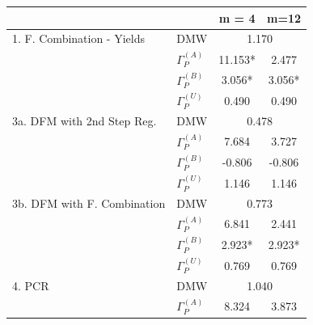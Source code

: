 \documentclass[11pt]{article}
\begin{document}
\begin{table}                                                          
\center                                                                
\begin{tabular}{|l|l|c|c|}                                             
\hline                                                                 
&&m = 4&m=12 \\                                                        
\hline                                                                 
1. F. Combination - Yields          & DMW&\multicolumn{2}{|c|}{1.170}\\
\hline                                                                 
& $\Gamma_P^{(A)}$&11.153*&2.477\\                                     
& $\Gamma_P^{(B)}$&3.056*&3.056*\\                                     
& $\Gamma_P^{(U)}$&0.490&0.490\\                                       
\hline                                                                 
3a. DFM with 2nd Step Reg.          & DMW&\multicolumn{2}{|c|}{0.478}\\
\hline                                                                 
& $\Gamma_P^{(A)}$&7.684&3.727\\                                       
& $\Gamma_P^{(B)}$&-0.806&-0.806\\                                     
& $\Gamma_P^{(U)}$&1.146&1.146\\                                       
\hline                                                                 
3b. DFM with F. Combination         & DMW&\multicolumn{2}{|c|}{0.773}\\
\hline                                                                 
& $\Gamma_P^{(A)}$&6.841&2.441\\                                       
& $\Gamma_P^{(B)}$&2.923*&2.923*\\                                     
& $\Gamma_P^{(U)}$&0.769&0.769\\                                       
\hline                                                                 
4. PCR                              & DMW&\multicolumn{2}{|c|}{1.040}\\
\hline                                                                 
& $\Gamma_P^{(A)}$&8.324&3.873\\                                       

\end{tabular}
\end{table}
\end{document}

